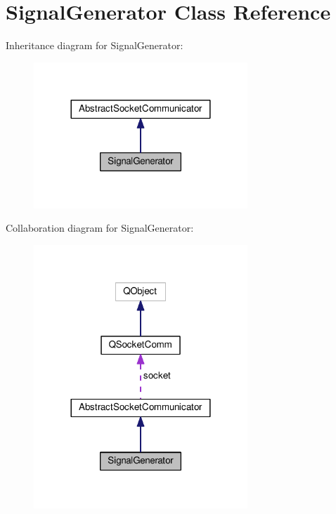 \hypertarget{class_signal_generator}{}\section{Signal\+Generator Class Reference}
\label{class_signal_generator}


Inheritance diagram for Signal\+Generator\+:
\nopagebreak
\begin{figure}[H]
\begin{center}
\leavevmode
\includegraphics[width=228pt]{class_signal_generator__inherit__graph}
\end{center}
\end{figure}


Collaboration diagram for Signal\+Generator\+:
\nopagebreak
\begin{figure}[H]
\begin{center}
\leavevmode
\includegraphics[width=228pt]{class_signal_generator__coll__graph}
\end{center}
\end{figure}
